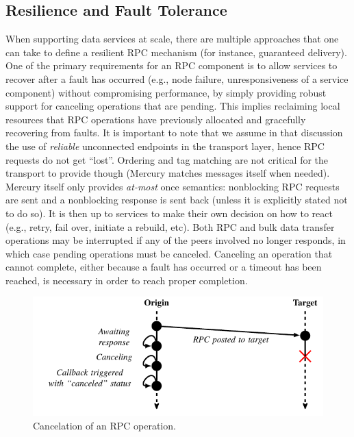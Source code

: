 \documentclass[11pt]{article}
\begin{document}
\subsection{Resilience and Fault Tolerance}
\label{sec:cb}

When supporting data services at scale, there are multiple approaches that one can take
to define a resilient RPC mechanism (for instance, guaranteed delivery).
One of the primary requirements for an RPC component is to allow services to
recover after a fault has occurred (e.g., node failure, unresponsiveness of a
service component) without compromising performance, by simply providing
robust support for canceling operations that are pending.
This implies reclaiming local resources that RPC operations have previously
allocated and gracefully recovering from faults.
It is important to note that we assume in that discussion the use of
\textit{reliable} unconnected endpoints in the transport layer, hence RPC requests
do not get ``lost''. Ordering and tag matching are not
critical for the transport to provide though (Mercury matches messages itself when needed).
Mercury itself only provides \textit{at-most} once semantics: nonblocking RPC
requests are sent and a nonblocking response is sent back (unless it is explicitly stated 
not to do so). It is then up to services to make their
own decision on how to react (e.g., retry, fail over, initiate a rebuild, etc).
Both RPC and bulk data transfer operations may be interrupted if any of the
peers involved no longer responds, in which case pending operations must be
canceled. Canceling an operation that cannot
complete, either because a fault has occurred or a timeout has been reached, 
is necessary in order to reach proper completion.

\begin{figure}[h]
\centering
\includegraphics{figs/cancel}
\caption{Cancelation of an RPC operation.}
\label{fig:cancel}
\end{figure}
\end{document}
